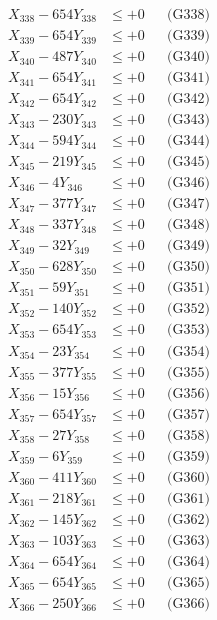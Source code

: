 \documentclass[a4paper,10pt]{article}
\begin{document}
{\begin{align}
X_{338} - 654Y_{338} &\leq +0 && \text{(G338)} \\
X_{339} - 654Y_{339} &\leq +0 && \text{(G339)} \\
X_{340} - 487Y_{340} &\leq +0 && \text{(G340)} \\
\allowbreak
X_{341} - 654Y_{341} &\leq +0 && \text{(G341)} \\
X_{342} - 654Y_{342} &\leq +0 && \text{(G342)} \\
X_{343} - 230Y_{343} &\leq +0 && \text{(G343)} \\
X_{344} - 594Y_{344} &\leq +0 && \text{(G344)} \\
X_{345} - 219Y_{345} &\leq +0 && \text{(G345)} \\
X_{346} - 4Y_{346} &\leq +0 && \text{(G346)} \\
X_{347} - 377Y_{347} &\leq +0 && \text{(G347)} \\
X_{348} - 337Y_{348} &\leq +0 && \text{(G348)} \\
X_{349} - 32Y_{349} &\leq +0 && \text{(G349)} \\
X_{350} - 628Y_{350} &\leq +0 && \text{(G350)} \\
\allowbreak
X_{351} - 59Y_{351} &\leq +0 && \text{(G351)} \\
X_{352} - 140Y_{352} &\leq +0 && \text{(G352)} \\
X_{353} - 654Y_{353} &\leq +0 && \text{(G353)} \\
X_{354} - 23Y_{354} &\leq +0 && \text{(G354)} \\
X_{355} - 377Y_{355} &\leq +0 && \text{(G355)} \\
X_{356} - 15Y_{356} &\leq +0 && \text{(G356)} \\
X_{357} - 654Y_{357} &\leq +0 && \text{(G357)} \\
X_{358} - 27Y_{358} &\leq +0 && \text{(G358)} \\
X_{359} - 6Y_{359} &\leq +0 && \text{(G359)} \\
X_{360} - 411Y_{360} &\leq +0 && \text{(G360)} \\
\allowbreak
X_{361} - 218Y_{361} &\leq +0 && \text{(G361)} \\
X_{362} - 145Y_{362} &\leq +0 && \text{(G362)} \\
X_{363} - 103Y_{363} &\leq +0 && \text{(G363)} \\
X_{364} - 654Y_{364} &\leq +0 && \text{(G364)} \\
X_{365} - 654Y_{365} &\leq +0 && \text{(G365)} \\
X_{366} - 250Y_{366} &\leq +0 && \text{(G366)} \\

\end{align}}
\end{document}
